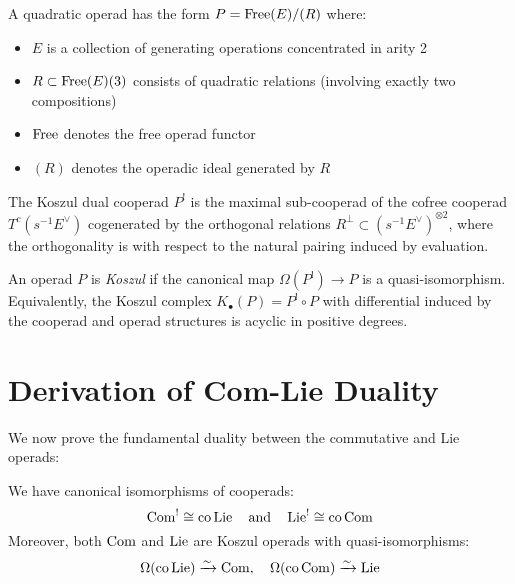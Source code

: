 \begin{definition}
A quadratic operad has the form $P = \operatorname{Free}(E)/(R)$ where:
\begin{itemize}
\item $E$ is a collection of generating operations concentrated in arity 2
\item $R \subset \operatorname{Free}(E)(3)$ consists of quadratic relations (involving exactly two compositions)
\item $\operatorname{Free}$ denotes the free operad functor
\item $(R)$ denotes the operadic ideal generated by $R$
\end{itemize}
\end{definition}
 
\begin{definition}
The Koszul dual cooperad $P^!$ is the maximal sub-cooperad of the cofree cooperad $T^c(s^{-1}E^\vee)$ cogenerated by the orthogonal relations $R^\perp \subset (s^{-1}E^\vee)^{\otimes 2}$, where the orthogonality is with respect to the natural pairing induced by evaluation.
\end{definition}
 
\begin{definition}
An operad $P$ is \emph{Koszul} if the canonical map $\Omega(P^!) \to P$ is a quasi-isomorphism. Equivalently, the Koszul complex $K_\bullet(P) = P^! \circ P$ with differential induced by the cooperad and operad structures is acyclic in positive degrees.
\end{definition}
 
\section{Derivation of Com-Lie Duality}
 
We now prove the fundamental duality between the commutative and Lie operads:
 
\begin{theorem}\label{thm:com-lie}
We have canonical isomorphisms of cooperads:
\[
\operatorname{Com}^! \cong \text{co}\operatorname{Lie} \quad \text{and} \quad \operatorname{Lie}^! \cong \text{co}\operatorname{Com}
\]
Moreover, both $\operatorname{Com}$ and $\operatorname{Lie}$ are Koszul operads with quasi-isomorphisms:
\[
\Omega(\text{co}\operatorname{Lie}) \xrightarrow{\sim} \operatorname{Com}, \quad \Omega(\text{co}\operatorname{Com}) \xrightarrow{\sim} \operatorname{Lie}
\]
\end{theorem}
 
